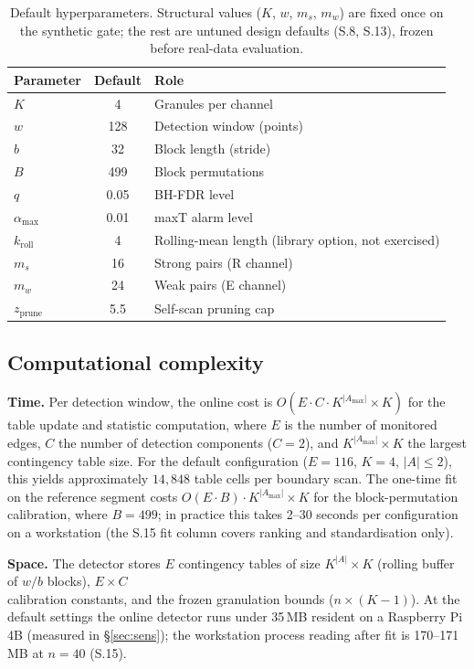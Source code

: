 \documentclass[11pt,a4paper]{article}
\begin{document}
\begin{table}[t]\centering\small
\caption{Default hyperparameters. Structural values ($K$, $w$, $m_s$,
$m_w$) are fixed once on the synthetic gate; the rest are untuned
design defaults (S.8, S.13), frozen before real-data evaluation.}
\label{tab:params}
\begin{tabular}{lcl}\hline
Parameter & Default & Role \\ \hline
$K$ & 4 & Granules per channel \\
$w$ & 128 & Detection window (points) \\
$b$ & 32 & Block length (stride) \\
$B$ & 499 & Block permutations \\
$q$ & 0.05 & BH-FDR level \\
$\alpha_{\max}$ & 0.01 & maxT alarm level \\
$k_{\mathrm{roll}}$ & 4 & Rolling-mean length (library option, not exercised) \\
$m_s$ & 16 & Strong pairs (R channel) \\
$m_w$ & 24 & Weak pairs (E channel) \\
$z_{\mathrm{prune}}$ & 5.5 & Self-scan pruning cap \\ \hline
\end{tabular}
\end{table}

\subsection{Computational complexity}\label{sec:complexity}

\textbf{Time.} Per detection window, the online cost is
$O(E \cdot C \cdot K^{|A_{\max}|}\times K)$ for the table update and statistic
computation, where $E$ is the number of monitored edges, $C$ the number
of detection components ($C{=}2$), and $K^{|A_{\max}|}\times K$ the largest
contingency table size. For the default configuration ($E{=}116$,
$K{=}4$, $|A|{\leq}2$), this yields approximately $14{,}848$ table
cells per boundary scan. The one-time fit on the reference segment
costs $O(E \cdot B) \cdot K^{|A_{\max}|}\times K$ for the block-permutation
calibration, where $B{=}499$; in practice this takes 2--30
seconds per configuration on a workstation (the S.15 fit column covers
ranking and standardisation only).

\textbf{Space.} The detector stores $E$ contingency tables of size
$K^{|A|} \times K$ (rolling buffer of $w/b$ blocks), $E \times C$  \\
calibration constants, and the frozen granulation bounds ($n \times
(K{-}1)$). At the default settings the online detector runs under 35\,MB
resident on a Raspberry Pi 4B (measured in \S\ref{sec:sens}); the
workstation process reading after fit is 170--171\,MB at $n{=}40$ (S.15).
\end{document}
